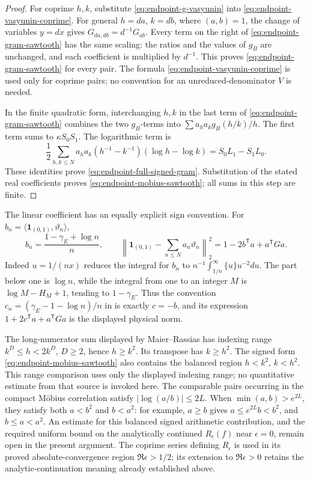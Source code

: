 \begin{proof}
For coprime \(h,k\), substitute
\eqref{eq:endpoint-g-vasyunin} into
\eqref{eq:endpoint-vasyunin-coprime}. For general \(h=da\),
\(k=db\), where \((a,b)=1\), the change of variables \(y=dx\)
gives \(G_{da,db}=d^{-1}G_{ab}\). Every term on the right of
\eqref{eq:endpoint-gram-sawtooth} has the same scaling:
the ratios and the values of \(g_B\) are unchanged, and each
coefficient is multiplied by \(d^{-1}\). This proves
\eqref{eq:endpoint-gram-sawtooth} for every pair. The formula
\eqref{eq:endpoint-vasyunin-coprime} is used only for coprime pairs;
no convention for an unreduced-denominator \(V\) is needed.

In the finite quadratic form, interchanging \(h,k\) in the last
term of \eqref{eq:endpoint-gram-sawtooth} combines the two
\(g_B\)-terms into \(\sum a_ha_k g_B(h/k)/h\).
The first term sums to \(\kappa S_0S_1\). The logarithmic term is
\[
 \frac12\sum_{h,k\le N}a_ha_k
           (h^{-1}-k^{-1})(\log h-\log k)
 =S_0L_1-S_1L_0.
\]
These identities prove \eqref{eq:endpoint-full-signed-gram}.
Substitution of the stated real coefficients proves
\eqref{eq:endpoint-mobius-sawtooth}; all sums in this step are finite.
\end{proof}

The linear coefficient has an equally explicit sign convention.
For \(b_n=\langle\mathbf1_{(0,1)},\vartheta_n\rangle\),
\[
 b_n=\frac{1-\gamma_E+\log n}{n},\qquad
 \left\|\mathbf1_{(0,1)}-\sum_{n\le N}a_n\vartheta_n\right\|_2^2
       =1-2b^{\mathsf T}a+a^{\mathsf T}Ga.
\]
Indeed \(u=1/(nx)\) reduces the integral for \(b_n\) to
\(n^{-1}\int_{1/n}^\infty\{u\}u^{-2}du\).
The part below one is \(\log n\), while the integral from one
to an integer \(M\) is \(\log M-H_M+1\), tending to
\(1-\gamma_E\). Thus the convention
\(c_n=(\gamma_E-1-\log n)/n\) in
\cite[Section~17, p.~52]{caceres-margin-v2} is exactly \(c=-b\),
and its expression \(1+2c^{\mathsf T}a+a^{\mathsf T}Ga\)
is the displayed physical norm.

The long-numerator sum displayed by Maier--Rassias
\cite[Theorem~2.1, p.~3]{maier-rassias-2018} has indexing range
\(k^D\le h<2k^D\), \(D\ge2\), hence \(h\ge k^2\).
Its transpose has \(k\ge h^2\). The signed form
\eqref{eq:endpoint-mobius-sawtooth} also contains the balanced
region \(h<k^2\), \(k<h^2\). This range comparison uses only
the displayed indexing range; no quantitative estimate from that
source is invoked here. The comparable pairs occurring in the
compact M\"obius correlation satisfy
\(\lvert\log(a/b)\rvert\le2L\). When
\(\min(a,b)>e^{2L}\), they satisfy both \(a<b^2\) and
\(b<a^2\): for example, \(a\ge b\) gives
\(a\le e^{2L}b<b^2\), and \(b\le a<a^2\).
An estimate for this balanced signed arithmetic contribution, and
the required uniform bound on the analytically continued
\(R_\epsilon(f)\) near \(\epsilon=0\), remain open in the present
argument. The coprime series defining \(R_\epsilon\) is used in
its proved absolute-convergence region \(\Re\epsilon>1/2\);
its extension to \(\Re\epsilon>0\) retains the analytic-continuation
meaning already established above.
